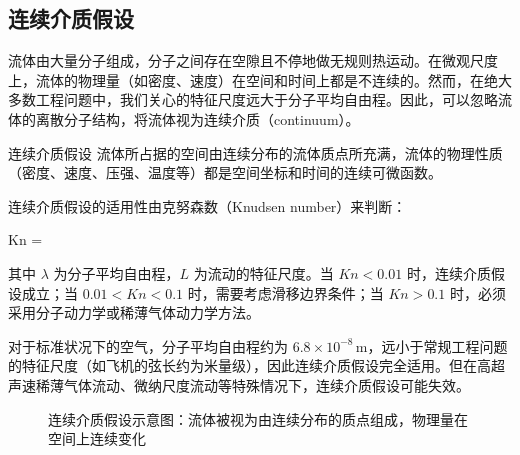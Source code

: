 \subsection{连续介质假设}

流体由大量分子组成，分子之间存在空隙且不停地做无规则热运动。在微观尺度上，流体的物理量（如密度、速度）在空间和时间上都是不连续的。然而，在绝大多数工程问题中，我们关心的特征尺度远大于分子平均自由程。因此，可以忽略流体的离散分子结构，将流体视为连续介质（continuum）。

\begin{mydefinition}{连续介质假设}
流体所占据的空间由连续分布的流体质点所充满，流体的物理性质（密度、速度、压强、温度等）都是空间坐标和时间的连续可微函数。
\end{mydefinition}

连续介质假设的适用性由克努森数（Knudsen number）来判断：

\begin{myformula}
Kn = 
\end{myformula}

其中 \(\lambda\) 为分子平均自由程，\(L\) 为流动的特征尺度。当 \(Kn < 0.01\) 时，连续介质假设成立；当 \(0.01 < Kn < 0.1\) 时，需要考虑滑移边界条件；当 \(Kn > 0.1\) 时，必须采用分子动力学或稀薄气体动力学方法。

对于标准状况下的空气，分子平均自由程约为 \(6.8\times 10^{-8}\,\text{m}\)，远小于常规工程问题的特征尺度（如飞机的弦长约为米量级），因此连续介质假设完全适用。但在高超声速稀薄气体流动、微纳尺度流动等特殊情况下，连续介质假设可能失效。

\begin{figure}[H]
\centering
{}
\caption{连续介质假设示意图：流体被视为由连续分布的质点组成，物理量在空间上连续变化}
\label{fig:continuum}
\end{figure}

